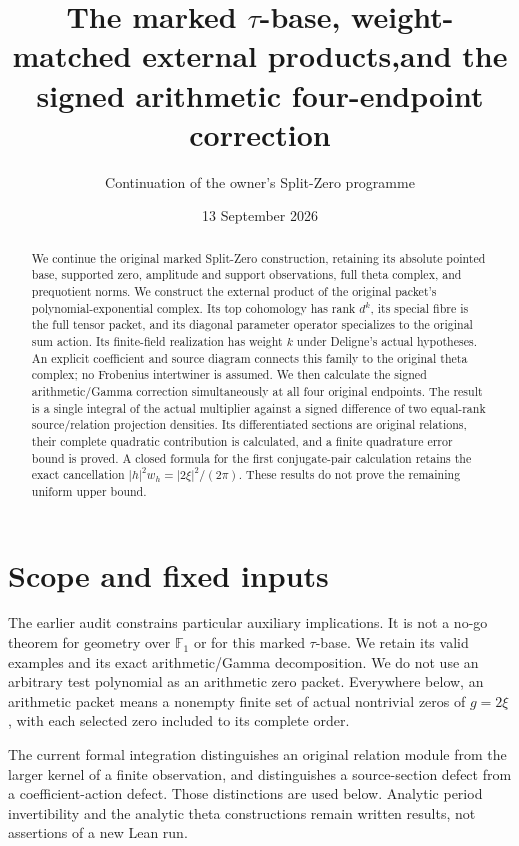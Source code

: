 \documentclass[11pt]{article}
\title{The marked $\tau$-base, weight-matched external products,\newline and the signed arithmetic four-endpoint correction}
\author{Continuation of the owner's Split-Zero programme}
\date{13 September 2026}
\begin{document}
\maketitle
\begin{abstract}
We continue the original marked Split-Zero construction, retaining its absolute pointed base, supported zero, amplitude and support observations, full theta complex, and prequotient norms. We construct the external product of the original packet's polynomial-exponential complex. Its top cohomology has rank $d^k$, its special fibre is the full tensor packet, and its diagonal parameter operator specializes to the original sum action. Its finite-field realization has weight $k$ under Deligne's actual hypotheses. An explicit coefficient and source diagram connects this family to the original theta complex; no Frobenius intertwiner is assumed. We then calculate the signed arithmetic/Gamma correction simultaneously at all four original endpoints. The result is a single integral of the actual multiplier against a signed difference of two equal-rank source/relation projection densities. Its differentiated sections are original relations, their complete quadratic contribution is calculated, and a finite quadrature error bound is proved. A closed formula for the first conjugate-pair calculation retains the exact cancellation $|h|^2w_h=|2\xi|^2/(2\pi)$. These results do not prove the remaining uniform upper bound.
\end{abstract}
\tableofcontents

\section{Scope and fixed inputs}
The earlier audit constrains particular auxiliary implications. It is not a no-go theorem for geometry over $\mathbb F_1$ or for this marked $\tau$-base. We retain its valid examples and its exact arithmetic/Gamma decomposition. We do not use an arbitrary test polynomial as an arithmetic zero packet. Everywhere below, an arithmetic packet means a nonempty finite set of actual nontrivial zeros of $g=2\xi$, with each selected zero included to its complete order.

The current formal integration distinguishes an original relation module from the larger kernel of a finite observation, and distinguishes a source-section defect from a coefficient-action defect. Those distinctions are used below. Analytic period invertibility and the analytic theta constructions remain written results, not assertions of a new Lean run.
\end{document}
